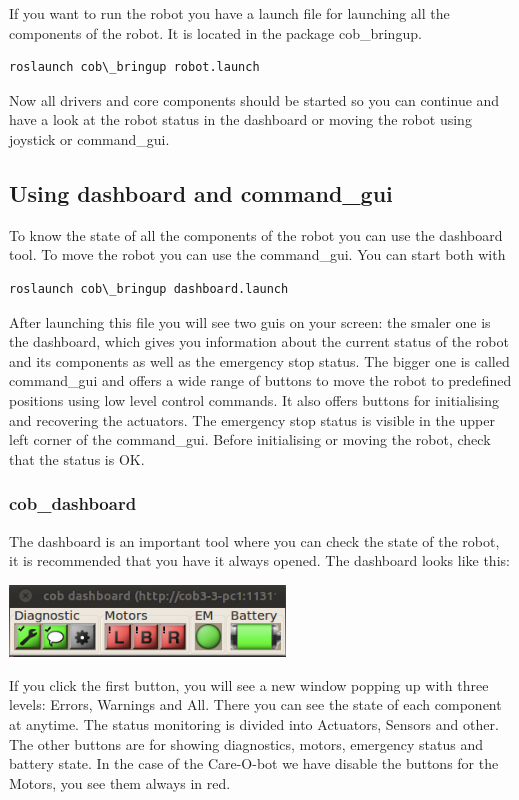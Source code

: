 If you want to run the robot you have a launch file for launching all the components of the robot. It is located in the package cob\_bringup.
\begin{lstlisting}
roslaunch cob\_bringup robot.launch
\end{lstlisting}

Now all drivers and core components should be started so you can continue and have a look at the robot status in the dashboard or moving the robot using joystick or command\_gui.

\subsection{Using dashboard and command\_gui}
To know the state of all the components of the robot you can use the dashboard tool. To move the robot you can use the command\_gui. You can start both with
\begin{lstlisting}
roslaunch cob\_bringup dashboard.launch
\end{lstlisting}

After launching this file you will see two guis on your screen: the smaler one is the dashboard, which gives you information about the current status of the robot and its components as well as the emergency stop status. The bigger one is called command\_gui and offers a wide range of buttons to move the robot to predefined positions using low level control commands. It also offers buttons for initialising and recovering the actuators. The emergency stop status is visible in the upper left corner of the command\_gui. Before initialising or moving the robot, check that the status is OK.

\subsubsection{cob\_dashboard}
The dashboard is an important tool where you can check the state of the robot, it is recommended that you have it always opened. The dashboard looks like this:

\begin{center}
\includegraphics[width=0.55\textwidth]{images/dashboard.png}
\end{center}
If you click the first button, you will see a new window popping up with three levels: Errors, Warnings and All. There you can see the state of each component at anytime. The status monitoring is divided into Actuators, Sensors and other. The other buttons are for showing diagnostics, motors, emergency status and battery state. In the case of the Care-O-bot we have disable the buttons for the Motors, you see them always in red.


